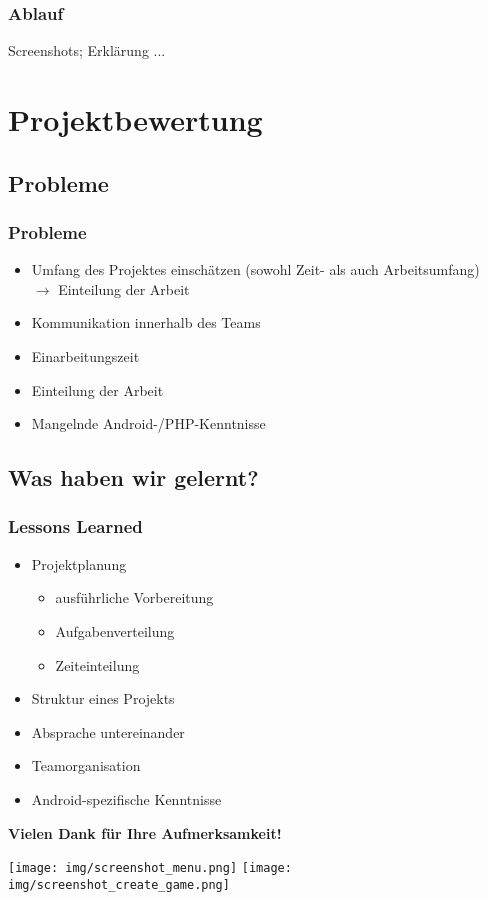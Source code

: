 \documentclass{beamer}
\begin{document}
\begin{frame}
\frametitle{Ablauf}
Screenshots; Erklärung ...
\end{frame}


\section{Projektbewertung}


	\subsection{Probleme}
\begin{frame}
\frametitle{Probleme}
\begin{itemize}
\item Umfang des Projektes einschätzen (sowohl Zeit- als auch Arbeitsumfang)
\\ $\rightarrow$ Einteilung der Arbeit
\pause
\item Kommunikation innerhalb des Teams
\pause
\item Einarbeitungszeit
\pause
\item Einteilung der Arbeit
\pause
\item Mangelnde Android-/PHP-Kenntnisse
\end{itemize}
\end{frame}
	
	
	\subsection{Was haben wir gelernt?}
\begin{frame}
\frametitle{Lessons Learned}
\begin{itemize}
\item Projektplanung
\begin{itemize}
	\item ausführliche Vorbereitung
	\item Aufgabenverteilung
	\item Zeiteinteilung
\end{itemize}
\pause
\item Struktur eines Projekts
\pause
\item Absprache untereinander
\pause
\item Teamorganisation
\pause
\item Android-spezifische Kenntnisse
\end{itemize}
\end{frame}


\begin{frame}
 \centering \textbf{Vielen Dank für Ihre Aufmerksamkeit!}
\end{frame}

\begin{frame}
\begin{center}


 \texttt{[image: img/screenshot\_menu.png]}
 \texttt{[image: img/screenshot\_create\_game.png]}
 \end{center}
\end{frame}
\end{document}
